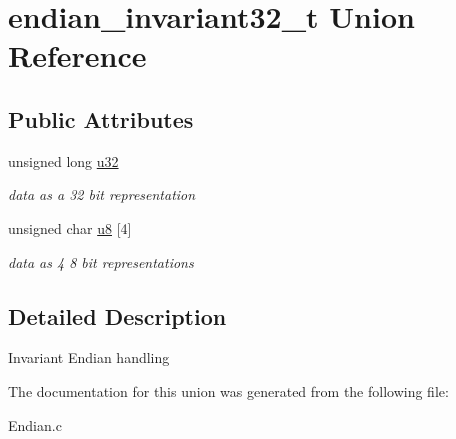 \hypertarget{unionendian__invariant32__t}{}\section{endian\+\_\+invariant32\+\_\+t Union Reference}
\label{unionendian__invariant32__t}
\subsection*{Public Attributes}
\begin{DoxyCompactItemize}
\item 
\hypertarget{unionendian__invariant32__t_aae8f18815b77080ab47538fc88f8a42b}{}unsigned long \hyperlink{unionendian__invariant32__t_aae8f18815b77080ab47538fc88f8a42b}{u32}\label{unionendian__invariant32__t_aae8f18815b77080ab47538fc88f8a42b}

\begin{DoxyCompactList}\small\item\em data as a 32 bit representation \end{DoxyCompactList}\item 
\hypertarget{unionendian__invariant32__t_ac8eb4bea8c11ae55516422bdeb36bca4}{}unsigned char \hyperlink{unionendian__invariant32__t_ac8eb4bea8c11ae55516422bdeb36bca4}{u8} \mbox{[}4\mbox{]}\label{unionendian__invariant32__t_ac8eb4bea8c11ae55516422bdeb36bca4}

\begin{DoxyCompactList}\small\item\em data as 4 8 bit representations \end{DoxyCompactList}\end{DoxyCompactItemize}


\subsection{Detailed Description}
Invariant Endian handling 

The documentation for this union was generated from the following file\+:\begin{DoxyCompactItemize}
\item 
Endian.\+c\end{DoxyCompactItemize}
